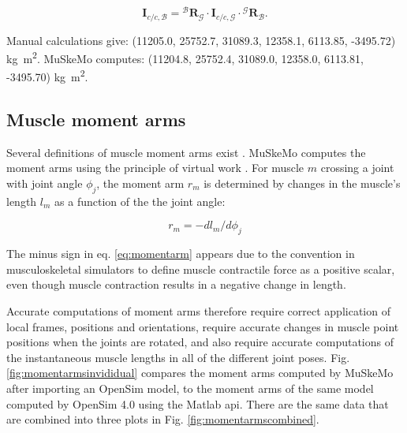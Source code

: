 \documentclass{article}
\begin{document}
\begin{equation}
    \mathbf{I}_{c/c,{\mathcal{B}}} = {}^{\mathcal{B}} \mathbf{R}_{\mathcal{G}} \cdot \mathbf{I}_{c/c,{\mathcal{G}}} \cdot {}^{\mathcal{G}} \mathbf{R}_{\mathcal{B}}.
\end{equation}

Manual calculations give: (11205.0, 25752.7, 31089.3, 12358.1, 6113.85, -3495.72) \si{kg m^2}. MuSkeMo computes: (11204.8, 25752.4, 31089.0, 12358.0, 6113.81, -3495.70) \si{kg m^2}.


\subsection{Muscle moment arms}
\label{sec:momentarmvalidation}

Several definitions of muscle moment arms exist \cite{anDeterminationMuscleOrientations1984}. MuSkeMo computes the moment arms using the principle of virtual work \cite{anDeterminationMuscleOrientations1984,storaceFunctionalAnalysisRole1979}. For muscle \(m\) crossing a joint with joint angle \(\phi_j\), the moment arm \(r_m\) is determined by changes in the muscle's length \(l_m\) as a function of the the joint angle:

\begin{equation}
r_m = -dl_m / d\phi_j
\end{equation}
\label{eq:momentarm}

The minus sign in eq. \ref{eq:momentarm} appears due to the convention in musculoskeletal simulators to define muscle contractile force as a positive scalar, even though muscle contraction results in a negative change in length.

Accurate computations of moment arms therefore require correct application of local frames, positions and orientations, require accurate changes in muscle point positions when the joints are rotated, and also require accurate computations of the instantaneous muscle lengths in all of the different joint poses. Fig. \ref{fig:momentarmsinvididual} compares the moment arms computed by MuSkeMo after importing an OpenSim model, to the moment arms of the same model computed by OpenSim 4.0 using the Matlab api. There are the same data that are combined into three plots in Fig. \ref{fig:momentarmscombined}.
\end{document}
